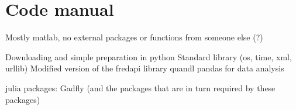 \chapter{Code manual}

Mostly matlab, no external packages or functions from someone else (?)

Downloading and simple preparation in python
Standard library (os, time, xml, urllib)
Modified version of the fredapi library
quandl
pandas for data analysis

julia
packages: Gadfly (and the packages that are in turn required by these packages)